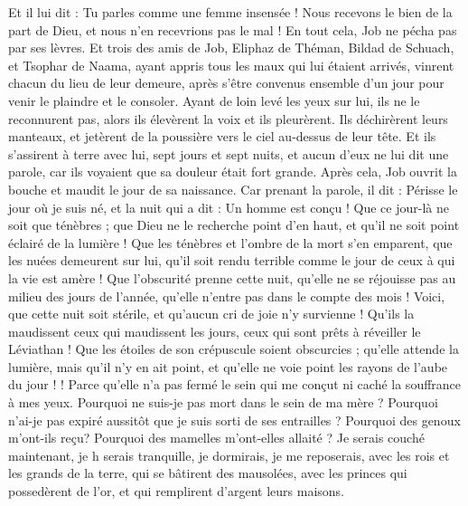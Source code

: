 \begin{multicols}{2}
Et il lui dit : Tu parles comme une femme insensée ! Nous recevons le bien de la part de Dieu, et nous n'en recevrions pas le mal ! En tout cela, Job ne pécha pas par ses lèvres.
Et trois des amis de Job, Eliphaz de Théman, Bildad de Schuach, et Tsophar de Naama, ayant appris tous les maux qui lui étaient arrivés, vinrent chacun du lieu de leur demeure, après s'être convenus ensemble d'un jour pour venir le plaindre et le consoler.
Ayant de loin levé les yeux sur lui, ils ne le reconnurent pas, alors ils élevèrent la voix et ils pleurèrent. Ils déchirèrent leurs manteaux, et jetèrent de la poussière vers le ciel au-dessus de leur tête.
Et ils s'assirent à terre avec lui, sept jours et sept nuits, et aucun d'eux ne lui dit une parole, car ils voyaient que sa douleur était fort grande.
\VerseOne{}Après cela, Job ouvrit la bouche et maudit le jour de sa naissance.
Car prenant la parole, il dit :
Périsse le jour où je suis né, et la nuit qui a dit : Un homme est conçu !
Que ce jour-là ne soit que ténèbres ; que Dieu ne le recherche point d'en haut, et qu'il ne soit point éclairé de la lumière ! 
Que les ténèbres et l'ombre de la mort s'en emparent, que les nuées demeurent sur lui, qu'il soit rendu terrible comme le jour de ceux à qui la vie est amère ! 
Que l'obscurité prenne cette nuit, qu'elle ne se réjouisse pas au milieu des jours de l'année, qu'elle n'entre pas dans le compte des mois !
Voici, que cette nuit soit stérile, et qu'aucun cri de joie n'y survienne !
Qu'ils la maudissent ceux qui maudissent les jours, ceux qui sont prêts à réveiller le Léviathan !
Que les étoiles de son crépuscule soient obscurcies ; qu'elle attende la lumière, mais qu'il n'y en ait point, et qu'elle ne voie point les rayons de l'aube du jour !  !
Parce qu'elle n'a pas fermé le sein qui me conçut ni caché la souffrance à mes yeux.
Pourquoi ne suis-je pas mort dans le sein de ma mère ? Pourquoi n'ai-je pas expiré aussitôt que je suis sorti de ses entrailles ?
Pourquoi des genoux m'ont-ils reçu? Pourquoi des mamelles m'ont-elles allaité ?
Je serais couché maintenant, je h serais tranquille, je dormirais, je me reposerais,
avec les rois et les grands de la terre, qui se bâtirent des mausolées,
avec les princes qui possedèrent de l'or, et qui remplirent d'argent leurs maisons.

\end{multicols}
